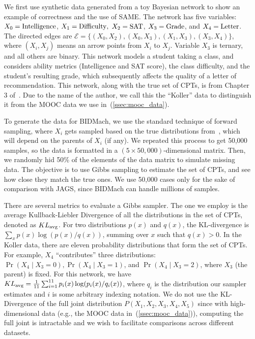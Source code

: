 \documentclass{article} %
\begin{document}
We first use synthetic data generated from a toy Bayesian network to show an example of correctness
and the use of SAME. The network has five variables: $X_0 = {\rm Intelligence}$, $X_1 =
{\rm Difficulty},$ $X_2 = {\rm SAT}$, $X_3 = {\rm Grade}$, and $X_4 = {\rm Letter}$. The directed
edges are $\mathcal{E} = \{(X_0, X_2), (X_0, X_3), (X_1,X_3), (X_3,X_4)\}$, where $(X_i,X_j)$ means
an arrow points from $X_i$ to $X_j$.  Variable $X_3$ is ternary, and all others are binary. This
network models a student taking a class, and considers ability metrics (Intelligence and SAT score),
the class difficulty, and the student's resulting grade, which subsequently affects the quality of a
letter of recommendation. This network, along with the true set of CPTs, is from Chapter 3
of~\citet{Koller2009}. Due to the name of the author, we call this the ``Koller'' data to
distinguish it from the MOOC data we use in~(\ref{ssec:mooc_data}).

To generate the data for BIDMach, we use the standard technique of forward sampling, where $X_i$
gets sampled based on the true distributions from~\citet{Koller2009}, which will depend on the
parents of $X_i$ (if any). We repeated this process to get 50,000 samples, so the data is
formatted in a $(5\times 50,000)$-dimensional matrix.  Then, we randomly hid 50\% of the elements of
the data matrix to simulate missing data. The objective is to use Gibbs sampling to estimate the set
of CPTs, and see how close they match the true ones. We use 50,000 cases only for the sake of
comparison with JAGS, since BIDMach can handle millions of samples.

There are several metrics to evaluate a Gibbs sampler. The one we employ is the average
Kullback-Liebler Divergence of all the distributions in the set of CPTs, denoted as $KL_{\rm avg}$.
For two distributions $p(x)$ and $q(x)$, the KL-divergence is $\sum_x p(x) \log(p(x)/q(x))$, summing
over $x$ such that $q(x) > 0$. In the Koller data, there are eleven probability distributions that
form the set of CPTs. For example, $X_4$ ``contributes'' three distributions: $\Pr(X_4 \mid X_3 =
0), \Pr(X_4 \mid X_3 = 1)$, and $\Pr(X_4 \mid X_3 = 2)$, where $X_3$ (the parent) is fixed. For this
network, we have $KL_{\rm avg} = \frac{1}{11} \sum_{i=1}^{11} p_i(x) \log(p_i(x)/q_i(x))$, where
$q_i$ is the distribution our sampler estimates and $i$ is some arbitrary indexing notation. We do
not use the KL-Divergence of the full joint distribution $P(X_1,X_2,X_3,X_4,X_5)$ since with
high-dimensional data (e.g., the MOOC data in~(\ref{ssec:mooc_data})), computing the full joint is
intractable and we wish to facilitate comparisons across different datasets.
\end{document}
